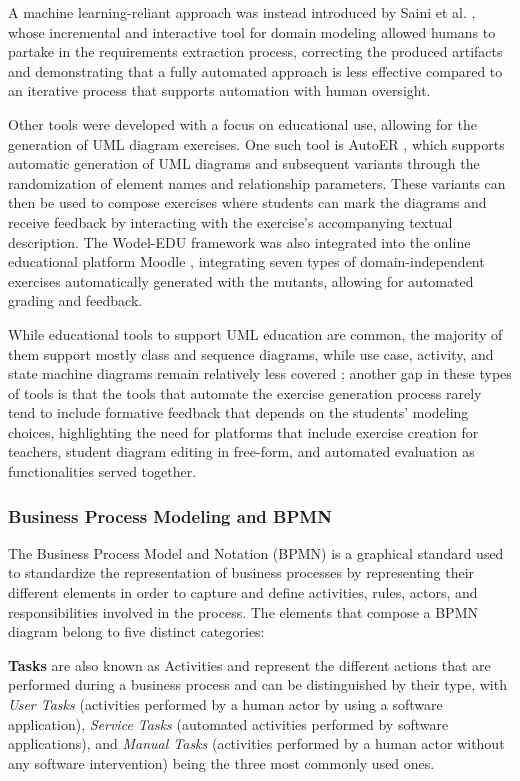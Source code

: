 A machine learning-reliant approach was instead introduced by Saini et al. \cite{saini2022machine}, whose incremental and interactive tool for domain modeling allowed humans to partake in the requirements extraction process, correcting the produced artifacts and demonstrating that a fully automated approach is less effective compared to an iterative process that supports automation with human oversight.

Other tools were developed with a focus on educational use, allowing for the generation of UML diagram exercises. One such tool is AutoER \cite{foss2022automatic}, which supports automatic generation of UML diagrams and subsequent variants through the randomization of element names and relationship parameters. These variants can then be used to compose exercises where students can mark the diagrams and receive feedback by interacting with the exercise's accompanying textual description. The Wodel-EDU framework was also integrated into the online educational platform Moodle \cite{gomez2023automated}, integrating seven types of domain-independent exercises automatically generated with the mutants, allowing for automated grading and feedback.

While educational tools to support UML education are common, the majority of them support mostly class and sequence diagrams, while use case, activity, and state machine diagrams remain relatively less covered \cite{huber2022tool}; another gap in these types of tools is that the tools that automate the exercise generation process rarely tend to include formative feedback that depends on the students' modeling choices, highlighting the need for platforms that include exercise creation for teachers, student diagram editing in free-form, and automated evaluation as functionalities served together.

\subsubsection{Business Process Modeling and BPMN}
\label{sec:back_bpmn}

The Business Process Model and Notation (BPMN) is a graphical standard used to standardize the representation of business processes by representing their different elements in order to capture and define activities, rules, actors, and responsibilities involved in the process. The elements that compose a BPMN diagram belong to five distinct categories:

\textbf{Tasks} are also known as Activities and represent the different actions that are performed during a business process and can be distinguished by their type, with \emph{User Tasks} (activities performed by a human actor by using a software application), \emph{Service Tasks} (automated activities performed by software applications), and \emph{Manual Tasks} (activities performed by a human actor without any software intervention) being the three most commonly used ones.

